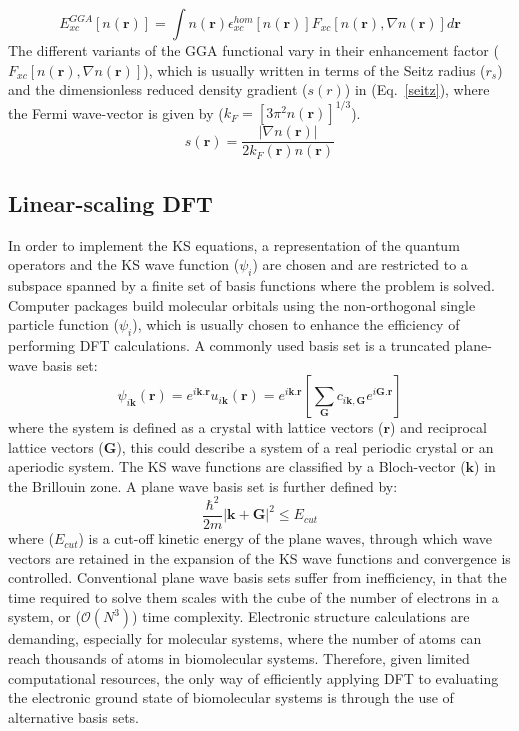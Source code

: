 %
\begin{equation}
E_{xc}^{GGA} [n(\mathbf{r})] = \int n(\mathbf{r}) \epsilon_{xc}^{hom} [n(\mathbf{r})] F_{xc}[n(\mathbf{r}), \nabla n(\mathbf{r})] d \mathbf{r}
\end{equation}
%
The different variants of the GGA functional vary in their enhancement factor ($F_{xc}[n(\mathbf{r}), \nabla n(\mathbf{r})]$), which is usually written in terms of the Seitz radius ($r_s$) and the dimensionless reduced density gradient ($s(r)$) in (Eq.~\ref{seitz}), where the Fermi wave-vector is given by ($k_F=[3 \pi^2 n(\mathbf{r})]^{1/3}$). 
%
\begin{equation} \label{seitz}
s(\mathbf{r}) = \frac{| \nabla n(\mathbf{r})|}{2 k_F(\mathbf{r}) n(\mathbf{r})}
\end{equation}
%
\subsection{Linear-scaling DFT} \label{sec:linear_scaling}
%
In order to implement the KS equations, a representation of the quantum operators and the KS wave function ($\psi_i$) are chosen and are restricted to a subspace spanned by a finite set of basis functions where the problem is solved. Computer packages build molecular orbitals using the non-orthogonal single particle function ($\psi_i$), which is usually chosen to enhance the efficiency of performing DFT calculations. A commonly used basis set is a truncated plane-wave basis set:
%
\begin{equation} \label{pw}
\psi_{i \mathbf{k}} (\mathbf{r}) = e^{i \mathbf{k . r}} u_{i \mathbf{k}} (\mathbf{r}) = e^{i \mathbf{k . r}} \left[ \sum_{\mathbf{G}} c_{i\mathbf{k,G}}e^{i \mathbf{G . r}} \right]
\end{equation}
%
where the system is defined as a crystal with lattice vectors ($\mathbf{r}$) and reciprocal lattice vectors ($\mathbf{G}$), this could describe a system of a real periodic crystal or an aperiodic system. The KS wave functions are classified by a Bloch-vector ($\mathbf{k}$) in the Brillouin zone. A plane wave basis set is further defined by:
%
\begin{equation}
\frac{\hbar^2}{2m} | \mathbf{k} + \mathbf{G} |^2 \leq E_{cut}
\end{equation}
%
where ($E_{cut}$) is a cut-off kinetic energy of the plane waves, through which wave vectors are retained in the expansion of the KS wave functions and convergence is controlled. Conventional plane wave basis sets suffer from inefficiency, in that the time required to solve them scales with the cube of the number of electrons in a system, or ($\mathcal{O}(N^3)$) time complexity. Electronic structure calculations are demanding, especially for molecular systems, where the number of atoms can reach thousands of atoms in biomolecular systems. Therefore, given limited computational resources, the only way of efficiently applying DFT to evaluating the electronic ground state of biomolecular systems is through the use of alternative basis sets. 

